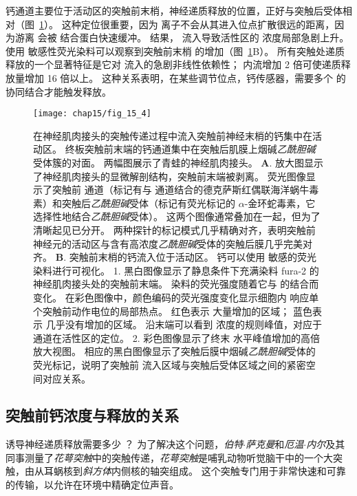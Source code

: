 钙通道主要位于活动区的突触前末梢，神经递质释放的位置，正好与突触后受体相对（图~\ref{fig:15_4}）。 
这种定位很重要，因为  离子不会从其进入位点扩散很远的距离，因为游离  会被  结合蛋白快速缓冲。 
结果， 流入导致活性区的  浓度局部急剧上升。 
使用  敏感性荧光染料可以观察到突触前末梢  的增加（图~\ref{fig:15_4}B）。
所有突触处递质释放的一个显著特征是它对  流入的急剧非线性依赖性；
 内流增加 2 倍可使递质释放量增加 16 倍以上。 
这种关系表明，在某些调节位点，钙传感器，需要多个  的协同结合才能触发释放。


\begin{figure}[htbp]
	\centering
	\texttt{[image: chap15/fig\_15\_4]}
	\caption{在神经肌肉接头的突触传递过程中流入突触前神经末梢的钙集中在活动区。
	终板突触前末端的钙通道集中在突触后肌膜上烟碱\textit{乙酰胆碱}受体簇的对面。
	两幅图展示了青蛙的神经肌肉接头。
	\textbf{A}. 放大图显示了神经肌肉接头的显微解剖结构，突触前末端被剥离。
	荧光图像显示了突触前  通道（标记有与  通道结合的德克萨斯红偶联海洋蜗牛毒素）和突触后\textit{乙酰胆碱}受体（标记有荧光标记的 $\alpha$-金环蛇毒素，它选择性地结合\textit{乙酰胆碱}受体）。
	这两个图像通常叠加在一起，但为了清晰起见已分开。
	两种探针的标记模式几乎精确对齐，表明突触前神经元的活动区与含有高浓度\textit{乙酰胆碱}受体的突触后膜几乎完美对齐\cite{robitaille1990strategic}。
	\textbf{B}. 突触前末梢的钙流入位于活动区。
	钙可以使用  敏感的荧光染料进行可视化。
	1. 黑白图像显示了静息条件下充满染料 fura-2 的神经肌肉接头处的突触前末端。
	染料的荧光强度随着它与  的结合而变化。
	在彩色图像中，颜色编码的荧光强度变化显示细胞内  响应单个突触前动作电位的局部热点。
	红色表示  大量增加的区域；
	蓝色表示  几乎没有增加的区域。
	沿末端可以看到  浓度的规则峰值，对应于  通道在活性区的定位。
	2. 彩色图像显示了终末  水平峰值增加的高倍放大视图。
	相应的黑白图像显示了突触后膜中烟碱\textit{乙酰胆碱}受体的荧光标记，说明了突触前  流入区域与突触后受体区域之间的紧密空间对应关系\cite{wachman2004spatial}。}
	\label{fig:15_4}
\end{figure}



\subsection{突触前钙浓度与释放的关系}

诱导神经递质释放需要多少 ？ 
为了解决这个问题，\textit{伯特$\cdot$萨克曼}和\textit{厄温$\cdot$内尔}及其同事测量了\textit{花萼突触}中的突触传递，\textit{花萼突触}是哺乳动物听觉脑干中的一个大突触，由从耳蜗核到\textit{斜方体}内侧核的轴突组成。
这个突触专门用于非常快速和可靠的传输，以允许在环境中精确定位声音。


